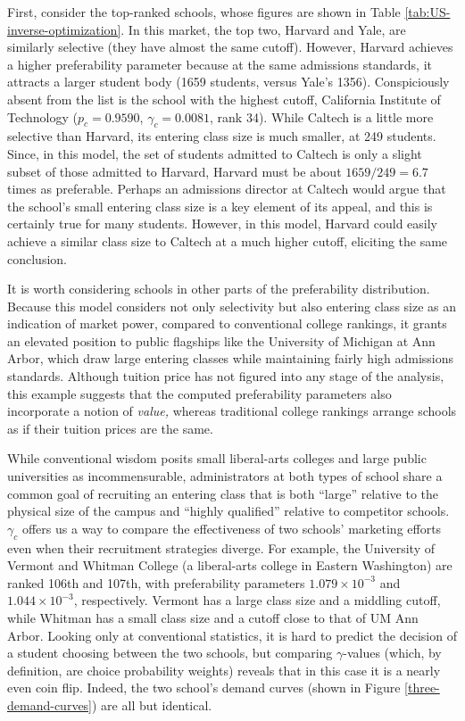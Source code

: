\documentclass[12pt]{article}
\theoremstyle{definition}
\begin{document}
First, consider the top-ranked schools, whose figures are shown in Table \ref{tab:US-inverse-optimization}. In this market, the top two, Harvard and Yale, are similarly selective (they have almost the same cutoff). However, Harvard achieves a higher preferability parameter because at the same admissions standards, it attracts a larger student body (1659 students, versus Yale's 1356). Conspiciously absent from the list is the school with the highest cutoff, California Institute of Technology ($p_c = 0.9590$, $\gamma_c = 0.0081$, rank 34). While Caltech is a little more selective than Harvard, its entering class size is much smaller, at 249 students. Since, in this model, the set of students admitted to Caltech is only a slight subset of those admitted to Harvard, Harvard must be about $1659 / 249 = 6.7$ times as preferable. Perhaps an admissions director at Caltech would argue that the school's small entering class size is a key element of its appeal, and this is certainly true for many students. However, in this model, Harvard could easily achieve a similar class size to Caltech at a much higher cutoff, eliciting the same conclusion.

It is worth considering schools in other parts of the preferability distribution. Because this model considers not only selectivity but also entering class size as an indication of market power, compared to conventional college rankings, it grants an elevated position to public flagships like the University of Michigan at Ann Arbor, which draw large entering classes while maintaining fairly high admissions standards. Although tuition price has not figured into any stage of the analysis, this example suggests that the computed preferability parameters also incorporate a notion of \emph{value,} whereas traditional college rankings arrange schools as if their tuition prices are the same.

While conventional wisdom posits small liberal-arts colleges and large public universities as incommensurable, administrators at both types of school share a common goal of recruiting an entering class that is both ``large'' relative to the physical size of the campus and ``highly qualified'' relative to competitor schools. $\gamma_c$ offers us a way to compare the effectiveness of two schools' marketing efforts even when their recruitment strategies diverge. For example, the University of Vermont and Whitman College (a liberal-arts college in Eastern Washington) are ranked 106th and 107th, with preferability parameters $1.079 \times 10^{-3}$ and $1.044 \times 10^{-3}$, respectively. Vermont has a large class size and a middling cutoff, while Whitman has a small class size and a cutoff close to that of UM Ann Arbor. Looking only at conventional statistics, it is hard to predict the decision of a student choosing between the two schools, but comparing $\gamma$-values (which, by definition, are choice probability weights) reveals that in this case it is a nearly even coin flip. Indeed, the two school's demand curves (shown in Figure \ref{three-demand-curves}) are all but identical. 
\end{document}

